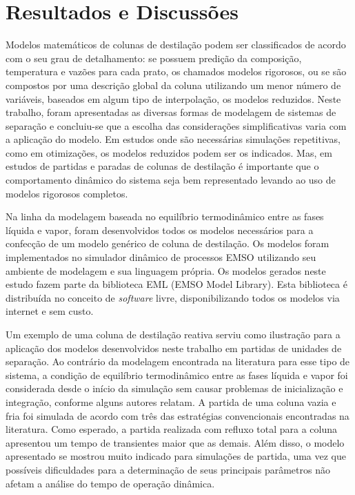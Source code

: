 %
% 
%
\chapter{Resultados e Discussões} \label{chap:resultados}
% 

Modelos matemáticos de colunas de destilação podem ser classificados de acordo com o seu
grau de detalhamento: se possuem predição da composição, temperatura e vazões para cada prato,
os chamados modelos rigorosos, ou se são compostos por uma descrição global da coluna
utilizando um menor número de variáveis, baseados em algum tipo de interpolação, os modelos
reduzidos. Neste trabalho, foram apresentadas as diversas formas de
modelagem de sistemas de separação e concluiu-se que a escolha das considerações
simplificativas varia com a aplicação do modelo. Em estudos onde são necessárias simulações
repetitivas, como em otimizações, os modelos reduzidos podem ser os indicados.
Mas, em estudos de partidas e paradas de colunas de destilação é importante que o
comportamento dinâmico do sistema seja bem representado levando ao uso de
modelos rigorosos completos. 

Na linha da modelagem baseada no equilíbrio termodinâmico entre as fases líquida e vapor, foram
desenvolvidos todos os modelos necessários para a confecção de um modelo genérico de coluna
de destilação. Os modelos foram implementados no simulador dinâmico de processos EMSO
utilizando seu ambiente de modelagem e sua linguagem própria. Os modelos gerados neste estudo
fazem parte da biblioteca EML (EMSO Model Library). Esta biblioteca é distribuída no conceito
de \emph{software} livre, disponibilizando todos os modelos via internet e sem
custo.

Um exemplo de uma coluna de destilação reativa serviu como ilustração para a aplicação
dos modelos desenvolvidos neste trabalho em partidas de unidades de separação.
Ao contrário da modelagem encontrada na literatura para esse tipo de sistema, a condição de
equilíbrio termodinâmico entre as fases líquida e vapor foi considerada desde o início da
simulação sem causar problemas de inicialização e integração, conforme alguns autores relatam.
A partida de uma
coluna vazia e fria foi simulada de acordo com três das estratégias convencionais encontradas
na literatura. Como esperado, a partida realizada com refluxo total para a coluna apresentou um
tempo de transientes maior que as demais. Além disso, o modelo apresentado se mostrou muito
indicado para simulações de partida, uma vez que possíveis dificuldades para a determinação de
seus principais parâmetros não afetam a análise do tempo de operação dinâmica.

